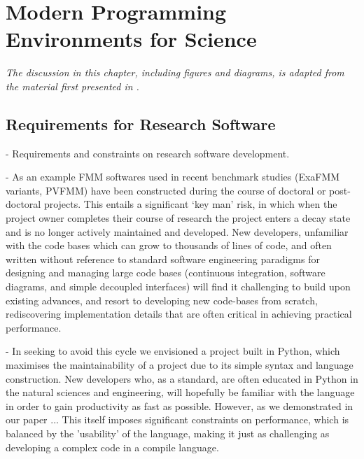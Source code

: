 \chapter{Modern Programming Environments for Science}\label{chpt:programming_for_science}
\thispagestyle{chaptertitle} %



\begin{center}
    \textit{The discussion in this chapter, including figures and diagrams, is adapted from the material first presented in \cite{kailasa2022pyexafmm}.}
\end{center}

\section{Requirements for Research Software}

- Requirements and constraints on research software development.

- As an example FMM softwares used in recent benchmark studies (ExaFMM variants, PVFMM) have been constructed during the course of doctoral or post-doctoral projects. This entails a significant `key man' risk, in which when the project owner completes their course of research the project enters a decay state and is no longer actively maintained and developed. New developers, unfamiliar with the code bases which can grow to thousands of lines of code, and often written without reference to standard software engineering paradigms for designing and managing large code bases (continuous integration, software diagrams, and simple decoupled interfaces) will find it challenging to build upon existing advances, and resort to developing new code-bases from scratch, rediscovering implementation details that are often critical in achieving practical performance.

- In seeking to avoid this cycle we envisioned a project built in Python, which maximises the maintainability of a project due to its simple syntax and language construction. New developers who, as a standard, are often educated in Python in the natural sciences and engineering, will hopefully be familiar with the language in order to gain productivity as fast as possible. However, as we demonstrated in our paper ... This itself imposes significant constraints on performance, which is balanced by the 'usability' of the language, making it just as challenging as developing a complex code in a compile language.


